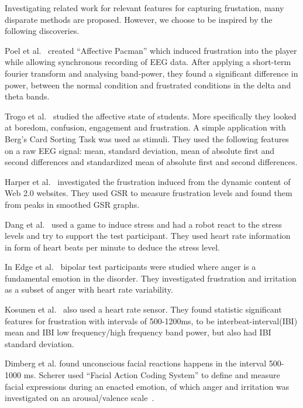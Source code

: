 Investigating related work for relevant features for capturing frustation, many disparate methods are proposed. However,
we choose to be inspired by the following discoveries.

Poel et al.~\cite{affective_pacman} created ``Affective Pacman'' which induced frustration into the player while allowing synchronous recording of EEG data. After applying a short-term fourier transform and analysing band-power, they found a significant difference in power, between the normal condition and frustrated conditions in the delta and theta bands.

Trogo et al.~\cite{brainwave_signals_frustration} studied the affective state of students. More specifically they looked at boredom, confusion, engagement and frustration. 
A simple application with Berg's Card Sorting Task\cite{bergs_card_sorting} was used as stimuli.
They used the following features on a raw EEG signal: mean, standard deviation, mean of absolute first and second differences and standardized mean of absolute first and second differences.

Harper et al.~\cite{web20_frustration} investigated the frustration induced from the dynamic content of Web 2.0 websites. 
They used GSR to measure frustration levels and found them from peaks in smoothed GSR graphs.

Dang et al.~\cite{stress_robot} used a game to induce stress and had a robot react to the stress levels and try to support the test participant. 
They used heart rate information in form of heart beats per minute to deduce the stress level.

In Edge et al.~\cite{bipolar_frustration} bipolar test participants were studied where anger is a fundamental emotion in the disorder. 
They investigated frustration and irritation as a subset of anger with heart rate variability.

Kosunen et al.~\cite{boredom_negative_mood_features} also used a heart rate sensor.
They found statistic significant features for frustration with intervals of 500-1200ms, to be interbeat-interval(IBI) mean and IBI low frequency/high frequency band power, but also had IBI standard deviation.

Dimberg et al. \cite{face_onset} found unconscious facial reactions happens in the interval 500-1000 ms.
Scherer used ``Facial Action Coding System'' to define and measure facial expressions during an enacted emotion, of which anger and irritation was investigated on an arousal/valence scale~\cite{scherer_kinect}.


